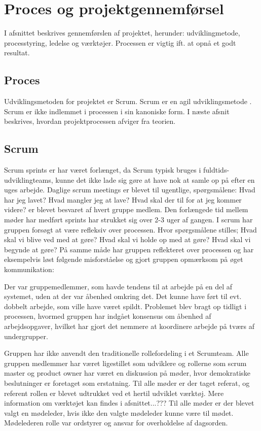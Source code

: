 \chapter{Proces og projektgennemførsel}

I afsnittet beskrives gennemførslen af projektet, herunder: udviklingmetode, processtyring, ledelse og værktøjer. Processen er vigtig ift. at opnå et godt resultat. 

\section{Proces}
Udviklingsmetoden for projektet er Scrum. Scrum er en agil udviklingsmetode \cite[kap. 1]{robertmartin2006}. Scrum er ikke indlemmet i processen i sin kanoniske form. I næste afsnit beskrives, hvordan projektprocessen afviger fra teorien.

\section{Scrum}
Scrum sprints er har været forlænget, da Scrum typisk bruges i fuldtids-udviklingteams, kunne det ikke lade sig gøre at have nok at samle op på efter en uges arbejde. Daglige scrum meetings er blevet til ugentlige, spørgsmålene: Hvad har jeg lavet? Hvad mangler jeg at lave? Hvad skal der til for at jeg kommer videre? er blevet besvaret af hvert gruppe medlem. Den forlængede tid mellem møder har medført sprints har strukket sig over 2-3 uger af gangen. I scrum har gruppen forsøgt at være refleksiv over processen. Hvor spørgsmålene stilles; Hvad skal vi blive ved med at gøre? Hvad skal vi holde op med at gøre? Hvad skal vi begynde at gøre? På samme måde har gruppen reflekteret over processen og har eksempelvis løst følgende misforståelse og gjort gruppen opmærksom på øget kommunikation:

Der var gruppemedlemmer, som havde tendens til at arbejde på en del af systemet, uden at der var åbenhed omkring det. Det kunne have ført til evt. dobbelt arbejde, som ville have været spildt. Problemet blev bragt op tidligt i processen, hvormed gruppen har indgået konsensus om åbenhed af arbejdsopgaver, hvilket har gjort det nemmere at koordinere arbejde på tværs af undergrupper.

Gruppen har ikke anvendt den traditionelle rollefordeling i et Scrumteam. Alle gruppen medlemmer har været ligestillet som udviklere og rollerne som scrum master og product owner har været en diskussion på møder, hvor demokratiske beslutninger er foretaget som erstatning. Til alle møder er der taget referat, og referent rollen er blevet udtrukket ved et hertil udviklet værktøj. Mere information om værktøjet kan findes i afsnittet...??? Til alle møder er der blevet valgt en mødeleder, hvis ikke den valgte mødeleder kunne være til mødet. Mødelederen rolle var ordstyrer og ansvar for overholdelse af dagsorden. 


